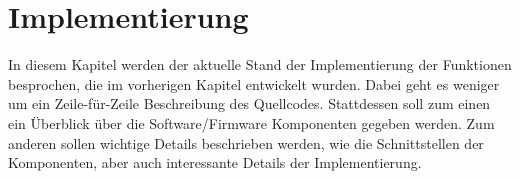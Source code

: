 \chapter{Implementierung}
In diesem Kapitel werden der aktuelle Stand der Implementierung der Funktionen besprochen, die im vorherigen Kapitel entwickelt wurden. Dabei geht es weniger um ein Zeile-für-Zeile Beschreibung des Quellcodes. Stattdessen soll zum einen ein Überblick über die Software/Firmware Komponenten gegeben werden. Zum anderen sollen  wichtige Details beschrieben werden, wie die Schnittstellen der Komponenten, aber auch interessante Details der Implementierung.




